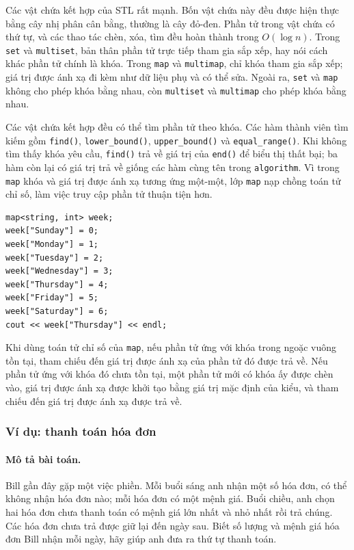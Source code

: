 \documentclass[11pt]{article}
\begin{document}
Các vật chứa kết hợp của STL rất mạnh. Bốn vật chứa này đều được hiện thực
bằng cây nhị phân cân bằng, thường là cây đỏ-đen. Phần tử trong vật chứa có
thứ tự, và các thao tác chèn, xóa, tìm đều hoàn thành trong \(O(\log n)\).
Trong \verb|set| và \verb|multiset|, bản thân phần tử trực tiếp tham gia sắp
xếp, hay nói cách khác phần tử chính là khóa. Trong \verb|map| và
\verb|multimap|, chỉ khóa tham gia sắp xếp; giá trị được ánh xạ đi kèm như dữ
liệu phụ và có thể sửa. Ngoài ra, \verb|set| và \verb|map| không cho phép
khóa bằng nhau, còn \verb|multiset| và \verb|multimap| cho phép khóa bằng
nhau.

Các vật chứa kết hợp đều có thể tìm phần tử theo khóa. Các hàm thành viên tìm
kiếm gồm \verb|find()|, \verb|lower_bound()|, \verb|upper_bound()| và
\verb|equal_range()|. Khi không tìm thấy khóa yêu cầu, \verb|find()| trả về
giá trị của \verb|end()| để biểu thị thất bại; ba hàm còn lại có giá trị trả
về giống các hàm cùng tên trong \verb|algorithm|. Vì trong \verb|map| khóa và
giá trị được ánh xạ tương ứng một-một, lớp \verb|map| nạp chồng toán tử chỉ
số, làm việc truy cập phần tử thuận tiện hơn.

\begin{verbatim}
map<string, int> week;
week["Sunday"] = 0;
week["Monday"] = 1;
week["Tuesday"] = 2;
week["Wednesday"] = 3;
week["Thursday"] = 4;
week["Friday"] = 5;
week["Saturday"] = 6;
cout << week["Thursday"] << endl;
\end{verbatim}

Khi dùng toán tử chỉ số của \verb|map|, nếu phần tử ứng với khóa trong ngoặc
vuông tồn tại, tham chiếu đến giá trị được ánh xạ của phần tử đó được trả về.
Nếu phần tử ứng với khóa đó chưa tồn tại, một phần tử mới có khóa ấy được
chèn vào, giá trị được ánh xạ được khởi tạo bằng giá trị mặc định của kiểu,
và tham chiếu đến giá trị được ánh xạ được trả về.

\subsubsection*{Ví dụ: thanh toán hóa đơn}

\paragraph{Mô tả bài toán.}
Bill gần đây gặp một việc phiền. Mỗi buổi sáng anh nhận một số hóa đơn, có
thể không nhận hóa đơn nào; mỗi hóa đơn có một mệnh giá. Buổi chiều, anh chọn
hai hóa đơn chưa thanh toán có mệnh giá lớn nhất và nhỏ nhất rồi trả chúng.
Các hóa đơn chưa trả được giữ lại đến ngày sau. Biết số lượng và mệnh giá hóa
đơn Bill nhận mỗi ngày, hãy giúp anh đưa ra thứ tự thanh toán.
\end{document}
